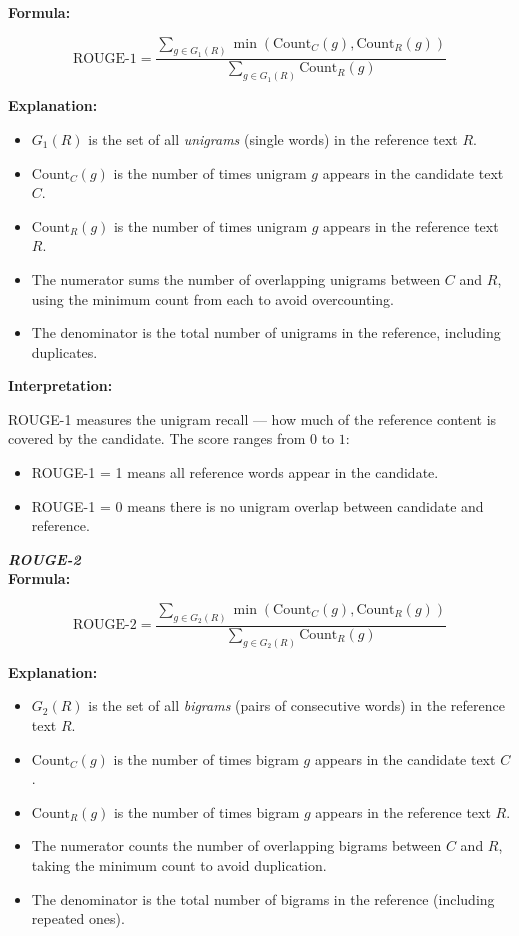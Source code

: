 \documentclass[conference]{IEEEtran}
\begin{document}
\textbf{Formula:}

\begin{equation}
\text{ROUGE-1} = \frac{\sum_{g \in G_1(R)} \min \left( \text{Count}_C(g), \text{Count}_R(g) \right)}{\sum_{g \in G_1(R)} \text{Count}_R(g)}
\end{equation}

\textbf{Explanation:}
\begin{itemize}
  \item $G_1(R)$ is the set of all \textit{unigrams} (single words) in the reference text $R$.
  \item $\text{Count}_C(g)$ is the number of times unigram $g$ appears in the candidate text $C$.
  \item $\text{Count}_R(g)$ is the number of times unigram $g$ appears in the reference text $R$.
  \item The numerator sums the number of overlapping unigrams between $C$ and $R$, using the minimum count from each to avoid overcounting.
  \item The denominator is the total number of unigrams in the reference, including duplicates.
\end{itemize}

\textbf{Interpretation:}

ROUGE-1 measures the unigram recall — how much of the reference content is covered by the candidate. The score ranges from $0$ to $1$:
\begin{itemize}
  \item ROUGE-1 = 1 means all reference words appear in the candidate.
  \item ROUGE-1 = 0 means there is no unigram overlap between candidate and reference.
\end{itemize}

\vspace{1em}
\noindent \textbf{\textit{ROUGE-2}}\\

\textbf{Formula:}

\begin{equation}
\text{ROUGE-2} = \frac{\sum_{g \in G_2(R)} \min \left( \text{Count}_C(g), \text{Count}_R(g) \right)}{\sum_{g \in G_2(R)} \text{Count}_R(g)}
\end{equation}

\textbf{Explanation:}
\begin{itemize}
  \item $G_2(R)$ is the set of all \textit{bigrams} (pairs of consecutive words) in the reference text $R$.
  \item $\text{Count}_C(g)$ is the number of times bigram $g$ appears in the candidate text $C$.
  \item $\text{Count}_R(g)$ is the number of times bigram $g$ appears in the reference text $R$.
  \item The numerator counts the number of overlapping bigrams between $C$ and $R$, taking the minimum count to avoid duplication.
  \item The denominator is the total number of bigrams in the reference (including repeated ones).
\end{itemize}
\end{document}
